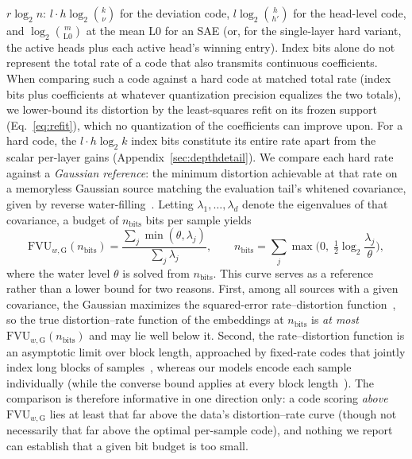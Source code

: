 $r\log_2 n$: $l\cdot h\log_2\binom{k}{\nu}$ for the deviation code,
$l\log_2\binom{h}{h'}$ for the head-level code, and
$\log_2\binom{m}{\mathrm{L0}}$ at the mean $\mathrm{L0}$ for an SAE (or,
for the single-layer hard variant, the active heads plus each active head's
winning entry). Index bits alone do not represent the total rate of a code
that also transmits continuous coefficients. When comparing such a code
against a hard code at matched total rate (index bits plus coefficients at
whatever quantization precision equalizes the two totals), we lower-bound
its distortion by the least-squares refit on its frozen support
(Eq.~\eqref{eq:refit}), which no quantization of the coefficients can
improve upon. For a hard code, the $l\cdot h\log_2 k$ index bits constitute
its entire rate apart from the scalar per-layer gains
(Appendix~\ref{sec:depthdetail}). We compare each hard rate against a
\emph{Gaussian reference}: the minimum distortion achievable at that rate
on a memoryless Gaussian source matching the evaluation tail's whitened
covariance, given by reverse water-filling~\cite[Thm.~10.3.3]{cover2006}.
Letting $\lambda_1, \dots, \lambda_d$ denote the eigenvalues of that
covariance, a budget of $n_{\mathrm{bits}}$ bits per sample yields
\begin{equation}
	\mathrm{FVU}_{w,\mathrm{G}}(n_{\mathrm{bits}}) = \frac{\sum_j \min(\theta, \lambda_j)}{\sum_j \lambda_j},
	\qquad
	n_{\mathrm{bits}} = \sum_j \max\!\Big(0,\; \tfrac{1}{2}\log_2 \frac{\lambda_j}{\theta}\Big),
	\label{eq:ratefloor}
\end{equation}
where the water level $\theta$ is solved from $n_{\mathrm{bits}}$. This
curve serves as a reference rather than a lower bound for two reasons.
First, among all sources with a given covariance, the Gaussian maximizes
the squared-error rate--distortion function~\cite[Problem~10.8]{cover2006},
so the true distortion--rate function of the embeddings at
$n_{\mathrm{bits}}$ is \emph{at most}
$\mathrm{FVU}_{w,\mathrm{G}}(n_{\mathrm{bits}})$ and may lie well below it.
Second, the rate--distortion function is an asymptotic limit over block
length, approached by fixed-rate codes that jointly index long blocks of
samples~\cite[Sec.~10.5]{cover2006}, whereas our models encode each sample
individually (while the converse bound applies at every block
length~\cite[Sec.~10.4]{cover2006}). The comparison is therefore informative
in one direction only: a code scoring \emph{above}
$\mathrm{FVU}_{w,\mathrm{G}}$ lies at least that far above the data's
distortion--rate curve (though not necessarily that far above the optimal
per-sample code), and nothing we report can establish that a given bit
budget is too small.

